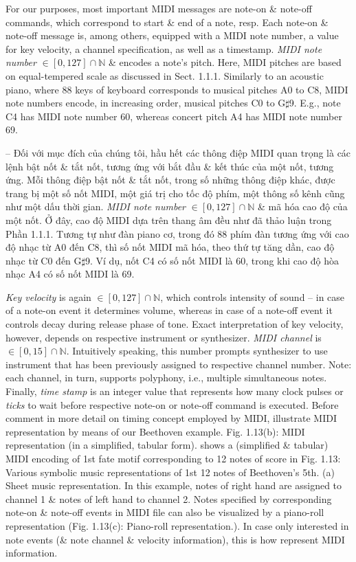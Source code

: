 \documentclass{article}
\begin{document}
\begin{itemize}
\begin{itemize}
\begin{itemize}
			For our purposes, most important MIDI messages are note-on \& note-off commands, which correspond to start \& end of a note, resp. Each note-on \& note-off message is, among others, equipped with a MIDI note number, a value for key velocity, a channel specification, as well as a timestamp. {\it MIDI note number} $\in[0,127]\cap\mathbb{N}$ \& encodes a note's pitch. Here, MIDI pitches are based on equal-tempered scale as discussed in Sect. 1.1.1. Similarly to an acoustic piano, where 88 keys of keyboard corresponds to musical pitches A0 to C8, MIDI note numbers encode, in increasing order, musical pitches C0 to G$\sharp$9. E.g., note C4 has MIDI note number 60, whereas concert pitch A4 has MIDI note number 69.
			
			-- Đối với mục đích của chúng tôi, hầu hết các thông điệp MIDI quan trọng là các lệnh bật nốt \& tắt nốt, tương ứng với bắt đầu \& kết thúc của một nốt, tương ứng. Mỗi thông điệp bật nốt \& tắt nốt, trong số những thông điệp khác, được trang bị một số nốt MIDI, một giá trị cho tốc độ phím, một thông số kênh cũng như một dấu thời gian. {\it MIDI note number} $\in[0,127]\cap\mathbb{N}$ \& mã hóa cao độ của một nốt. Ở đây, cao độ MIDI dựa trên thang âm đều như đã thảo luận trong Phần 1.1.1. Tương tự như đàn piano cơ, trong đó 88 phím đàn tương ứng với cao độ nhạc từ A0 đến C8, thì số nốt MIDI mã hóa, theo thứ tự tăng dần, cao độ nhạc từ C0 đến G$\sharp$9. Ví dụ, nốt C4 có số nốt MIDI là 60, trong khi cao độ hòa nhạc A4 có số nốt MIDI là 69.
			
			{\it Key velocity} is again $\in[0,127]\cap\mathbb{N}$, which controls intensity of sound -- in case of a note-on event it determines volume, whereas in case of a note-off event it controls decay during release phase of tone. Exact interpretation of key velocity, however, depends on respective instrument or synthesizer. {\it MIDI channel} is $\in[0,15]\cap\mathbb{N}$. Intuitively speaking, this number prompts synthesizer to use instrument that has been previously assigned to respective channel number. Note: each channel, in turn, supports polyphony, i.e., multiple simultaneous notes. Finally, {\it time stamp}  is an integer value that represents how many clock pulses or {\it ticks} to wait before respective note-on or note-off command is executed. Before comment in more detail on timing concept employed by MIDI, illustrate MIDI representation by means of our Beethoven example. {\sf Fig. 1.13(b): MIDI representation (in a simplified, tabular form).} shows a (simplified \& tabular) MIDI encoding of 1st fate motif corresponding to 12 notes of score in {\sf Fig. 1.13: Various symbolic music representations of 1st 12 notes of Beethoven's 5th. (a) Sheet music representation.} In this example, notes of right hand are assigned to channel 1 \& notes of left hand to channel 2. Notes specified by corresponding note-on \& note-off events in MIDI file can also be visualized by a piano-roll representation ({\sf Fig. 1.13(c): Piano-roll representation.}). In case only interested in note events (\& note channel \& velocity information), this is how represent MIDI information.
			

\end{itemize}
\end{itemize}
\end{itemize}
\end{document}
